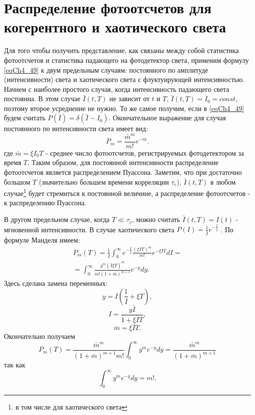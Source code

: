 \section{Распределение фотоотсчетов для когерентного и хаотического
  света}
Для того чтобы получить представление, как связаны между собой
статистика фотоотсчетов и статистика падающего на фотодетектор света,
применим формулу \eqref{eqCh4_49} к двум предельным случаям:
постоянного по амплитуде (интенсивности) света и хаотического света с
флуктуирующей 
интенсивностью. Начнем с наиболее простого случая, когда интенсивность падающего
света постоянна. В этом случае $\bar{I}\left(t, T\right)$ не зависит
от $t$ и $T$, $\bar{I}\left(t, T\right) = I_0 = const$,  поэтому  
второе усреднение не нужно. То же самое получим, если в
\eqref{eqCh4_49} будем считать $P\left(\bar{I}\right) =
\delta\left(\bar{I} - I_0\right)$.  Окончательное выражение для случая 
постоянного по интенсивности света имеет вид: 
\begin{equation}
P_m = \frac{\bar{m}^m}{m!}e^{- \bar{m}}.
\label{eqCh4_50}
\end{equation}
где $\bar{m} = \xi I_0 T$ - среднее число фотоотсчетов, регистрируемых
фотодетектором за время $T$.  Таким образом, для постоянной
интенсивности распределение фотоотсчетов является распределением
Пуассона. Заметим, что при достаточно большом $T$ (значительно большем
времени корреляции $\tau_c$), $\bar{I}\left(t, T\right)$  в любом
случае\footnote{в том числе для хаотического света}  будет стремиться к
постоянной величине, а распределение фотоотсчетов - к распределению
Пуассона. 
  
В другом предельном случае, когда $T \ll \tau_c$,  можно считать
$\bar{I}\left(t, T\right) = I\left(t\right)$ - мгновенной
интенсивности. В случае хаотического света $P\left(I\right) =
\frac{1}{\bar{I}} e^{- \frac{I}{\bar{I}}}$ \cite{bLoudon1976}.  
По формуле Манделя имеем:
\begin{eqnarray}
P_m\left(T\right) = \frac{1}{\bar{I}}\int_0^{\infty} e^{- \frac{I}{\bar{I}}}
\frac{\left(\xi I T\right)^m}{m!} e^{-
  \xi I T} d I = 
\nonumber \\
= \int_0^{\infty} \frac{y^m\left(\bar{I} \xi
  T\right)^m}{m!\left(1 + \bar{m}\right)^{m + 1}} e^{-y} dy.
\label{eqCh4_51}
\end{eqnarray}
Здесь сделана замена переменных:
\[
y = I \left(\frac{1}{\bar{I}} + \xi T\right),
\]
\[
I = \frac{y \bar{I}}{1 + \xi \bar{I} T},
\]
\[
\bar{m} = \xi \bar{I} T.
\]
Окончательно получаем
\begin{equation}
P_m\left(T\right) = 
\frac{\bar{m}^m}{\left(1 + \bar{m}\right)^{m + 1} m!}
\int_0^{\infty}y^m e^{-y}dy = 
\frac{\bar{m}^m}{\left(1 + \bar{m}\right)^{m + 1}}
\label{eqCh4_52}
\end{equation}
так как
\[
\int_0^{\infty}y^m e^{-y}dy = m!.
\]

